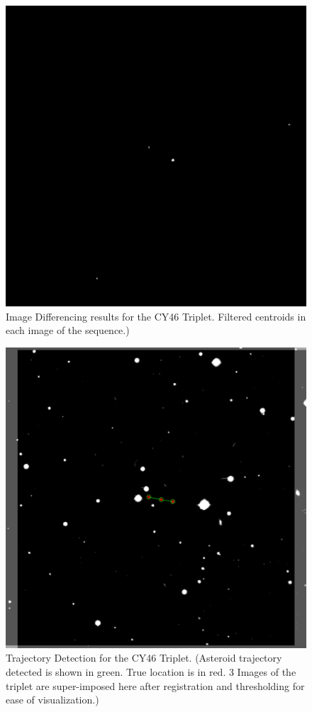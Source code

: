 \begin{figure}
\endminipage\hfill
{}
  \includegraphics[width=\linewidth]{Figures/NEATFilteredCentroids3.pdf}
\endminipage
\caption{Image Differencing results for the CY46 Triplet. Filtered centroids in each image of the sequence.)}
\label{fig:NEAT_ImgDiff2}
\end{figure}

\begin{figure}[b]
  \includegraphics[width=\linewidth]{Figures/NEATLines_LogicalImg.pdf}
\endminipage\hfill
\caption{Trajectory Detection for the CY46 Triplet. (Asteroid trajectory detected is shown in green. True location is in red. 3 Images of the triplet are super-imposed here after registration and thresholding for ease of visualization.)}
\label{fig:NEAT}
\end{figure}

